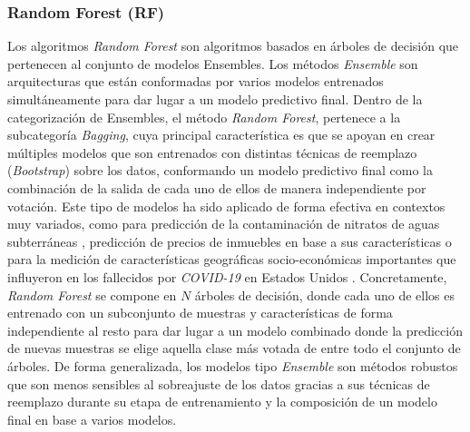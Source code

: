 \subsubsection*{Random Forest (RF)}
\label{RF_INTRODUCTION_TO_ENSEMBLES}



Los algoritmos \textit{Random Forest} son algoritmos basados en árboles de decisión que pertenecen al conjunto de modelos Ensembles. Los métodos \textit{Ensemble} son arquitecturas que están conformadas por varios modelos entrenados simultáneamente para dar lugar a un modelo predictivo final. Dentro de la categorización de Ensembles, el método \textit{Random Forest}, pertenece a la subcategoría \textit{Bagging}, cuya principal característica es que se apoyan en crear múltiples modelos que son entrenados con distintas técnicas de reemplazo (\textit{Bootstrap}) sobre los datos, conformando un modelo predictivo final como la combinación de la salida de cada uno de ellos de manera independiente por votación. Este tipo de modelos ha sido aplicado de forma efectiva en contextos muy variados, como para predicción de la contaminación de nitratos de aguas subterráneas \cite{HE2022133388}, predicción de precios de inmuebles en base a sus características \cite{ADETUNJI2022806} o para la medición de características geográficas socio-económicas importantes que influyeron en los fallecidos por \textit{COVID-19} en Estados Unidos \cite{GREKOUSIS2022102744}. Concretamente, \textit{Random Forest} se compone en $N$ árboles de decisión, donde cada uno de ellos es entrenado con un subconjunto de muestras y características de forma independiente al resto para dar lugar a un modelo combinado donde la predicción de nuevas muestras se elige aquella clase más votada de entre todo el conjunto de árboles. De forma generalizada, los modelos tipo \textit{Ensemble} son métodos robustos que son menos sensibles al sobreajuste de los datos gracias a sus técnicas de reemplazo durante su etapa de entrenamiento y la composición de un modelo final en base a varios modelos.


